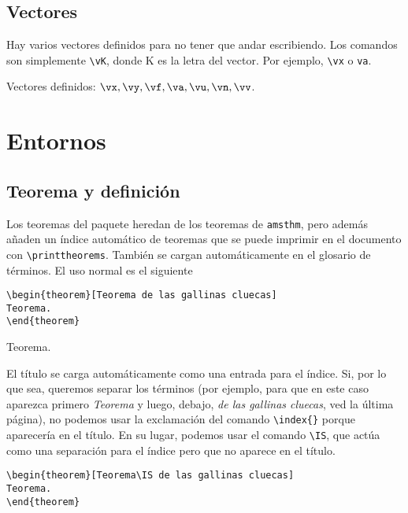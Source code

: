 \documentclass{apuntes}
\begin{document}
\subsection{Vectores}

Hay varios vectores definidos para no tener que andar escribiendo. Los comandos son simplemente \verb|\vK|, donde K es la letra del vector. Por ejemplo, \verb|\vx| o \verb|va|.

Vectores definidos: $\vx, \vy, \vf, \va, \vu, \vn, \vv$.

\section{Entornos}
\subsection{Teorema y definición}

Los teoremas del paquete heredan de los teoremas de \texttt{amsthm}, pero además añaden un índice automático de teoremas que se puede imprimir en el documento con \verb|\printtheorems|. También se cargan automáticamente en el glosario de términos. El uso normal es el siguiente

\begin{verbatim}
\begin{theorem}[Teorema de las gallinas cluecas]
Teorema.
\end{theorem}
\end{verbatim}

\begin{theorem}
Teorema.
\end{theorem}

El título se carga automáticamente como una entrada para el índice. Si, por lo que sea, queremos separar los términos (por ejemplo, para que en este caso aparezca primero \textit{Teorema} y luego, debajo, \textit{de las gallinas cluecas}, ved la última página), no podemos usar la exclamación del comando \verb|\index{}| porque aparecería en el título. En su lugar, podemos usar el comando \verb|\IS|, que actúa como una separación para el índice pero que no aparece en el título.

\begin{verbatim}
\begin{theorem}[Teorema\IS de las gallinas cluecas]
Teorema.
\end{theorem}
\end{verbatim}
\end{document}

